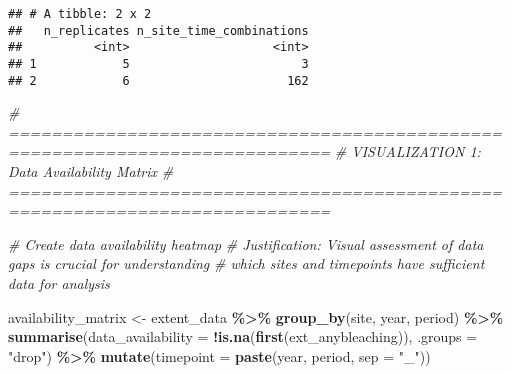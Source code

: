 \documentclass[
]{article}
\newenvironment{Shaded}{\begin{snugshade}}{\end{snugshade}}
\newcommand{\AttributeTok}[1]{\textcolor[rgb]{0.13,0.29,0.53}{#1}}
\newcommand{\CommentTok}[1]{\textcolor[rgb]{0.56,0.35,0.01}{\textit{#1}}}
\newcommand{\FunctionTok}[1]{\textcolor[rgb]{0.13,0.29,0.53}{\textbf{#1}}}
\newcommand{\NormalTok}[1]{#1}
\newcommand{\OtherTok}[1]{\textcolor[rgb]{0.56,0.35,0.01}{#1}}
\newcommand{\SpecialCharTok}[1]{\textcolor[rgb]{0.81,0.36,0.00}{\textbf{#1}}}
\newcommand{\StringTok}[1]{\textcolor[rgb]{0.31,0.60,0.02}{#1}}
\begin{document}
\begin{verbatim}
## # A tibble: 2 x 2
##   n_replicates n_site_time_combinations
##          <int>                    <int>
## 1            5                        3
## 2            6                      162
\end{verbatim}

\begin{Shaded}
\begin{Highlighting}[]
\CommentTok{\# ============================================================================}
\CommentTok{\# VISUALIZATION 1: Data Availability Matrix}
\CommentTok{\# ============================================================================}

\CommentTok{\# Create data availability heatmap}
\CommentTok{\# Justification: Visual assessment of data gaps is crucial for understanding}
\CommentTok{\# which sites and timepoints have sufficient data for analysis}

\NormalTok{availability\_matrix }\OtherTok{\textless{}{-}}\NormalTok{ extent\_data }\SpecialCharTok{\%\textgreater{}\%}
  \FunctionTok{group\_by}\NormalTok{(site, year, period) }\SpecialCharTok{\%\textgreater{}\%}
  \FunctionTok{summarise}\NormalTok{(}\AttributeTok{data\_availability =} \SpecialCharTok{!}\FunctionTok{is.na}\NormalTok{(}\FunctionTok{first}\NormalTok{(ext\_anybleaching)), }\AttributeTok{.groups =} \StringTok{"drop"}\NormalTok{) }\SpecialCharTok{\%\textgreater{}\%}
  \FunctionTok{mutate}\NormalTok{(}\AttributeTok{timepoint =} \FunctionTok{paste}\NormalTok{(year, period, }\AttributeTok{sep =} \StringTok{"\_"}\NormalTok{))}


\end{Highlighting}
\end{Shaded}
\end{document}
